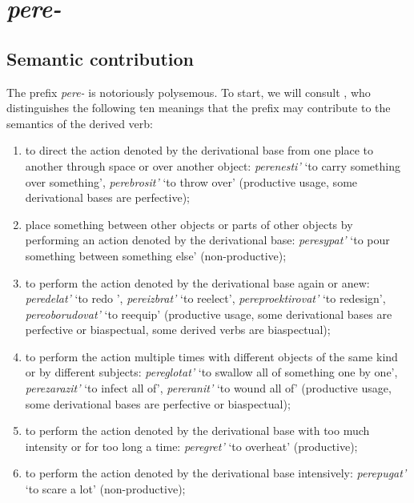 \section{\textit{pere-}  }\label{subsection:semantics:pere}
\subsection{Semantic contribution}
The prefix \textit{pere-}   is notoriously polysemous. To start, we will consult \citet[pp. 363--364]{Shvedova:82}, who distinguishes the following ten meanings that the prefix may contribute to the semantics of the derived verb:
\begin{enumerate}
\item to direct the action denoted by the derivational base from one place to another through space or over another object: \textit{perenesti'} `to carry something over something', \textit{perebrosit'} `to throw over' (productive usage, some derivational bases are perfective); 
\item place something between other objects or parts of other objects by performing an action denoted by the derivational base: \textit{peresypat'} `to pour something between something else' (non-productive); 
\item to perform the action denoted by the derivational base again or anew: \textit{peredelat'} `to redo ', \textit{pereizbrat'} `to reelect', \textit{pereproektirovat'} `to redesign', \textit{pereoborudovat'} `to reequip' (productive usage, some derivational bases are perfective or biaspectual, some derived verbs are biaspectual);
\item to perform the action multiple times with different objects of the same kind or by different subjects: \textit{pereglotat'} `to swallow all of something one by one', \textit{perezarazit'} `to infect all of', \textit{pereranit'} `to wound all of' (productive usage, some derivational bases are perfective or biaspectual);
\item to perform the action denoted by the derivational base with too much intensity or for too long a time: \textit{peregret'} `to overheat' (productive); 
\item to perform the action denoted by the derivational base intensively: \textit{perepugat'} `to scare a lot' (non-productive); 

\end{enumerate}
